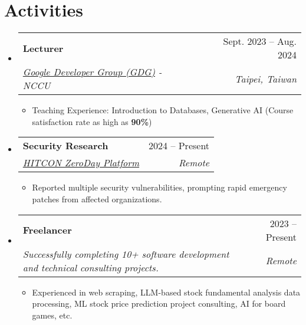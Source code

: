 \documentclass[letterpaper,10pt]{article}
\makeatletter
\newcommand{\resumeItem}[1]{
  \item\small{
    {#1 \vspace{-2pt}}
  }
}
\newcommand{\resumeSubheading}[4]{
  \vspace{-2pt}\item
    \begin{tabular*}{0.97\textwidth}[t]{l@{\extracolsep{\fill}}r}
      \textbf{#1} & #2 \\
      \textit{\small#3} & \textit{\small #4} \\
    \end{tabular*}\vspace{-7pt}
}
\newcommand{\resumeSubHeadingListStart}{\begin{itemize}[leftmargin=0.15in, label={}]}
\newcommand{\resumeSubHeadingListEnd}{\end{itemize}}
\newcommand{\resumeItemListStart}{\begin{itemize}}
\newcommand{\resumeItemListEnd}{\end{itemize}\vspace{-5pt}}
\makeatother
\begin{document}
\section{Activities}
  \resumeSubHeadingListStart
    \resumeSubheading
    {Lecturer}{Sept. 2023 -- Aug. 2024}
    {\href{https://developers.google.com/community/gdg}{Google Developer Group (GDG)} - NCCU}{Taipei, Taiwan}
    \resumeItemListStart
      \resumeItem{Teaching Experience: Introduction to Databases, Generative AI (Course satisfaction rate as high as \textbf{90\%})}
    \resumeItemListEnd

    \resumeSubheading
    {Security Research}{2024 -- Present}
    {\href{https://zeroday.hitcon.org/user/JustinHsu/vulnerability}{HITCON ZeroDay Platform}}{Remote}
    \resumeItemListStart
      \resumeItem{Reported multiple security vulnerabilities, prompting rapid emergency patches from affected organizations.}
    \resumeItemListEnd

    \resumeSubheading
    {Freelancer}{2023 -- Present}
    {Successfully completing 10+ software development and technical consulting projects.}{Remote}
    \resumeItemListStart
      \resumeItem{Experienced in web scraping, LLM-based stock fundamental analysis data processing, ML stock price prediction project consulting, AI for board games, etc.}
    \resumeItemListEnd

  \resumeSubHeadingListEnd
\end{document}
